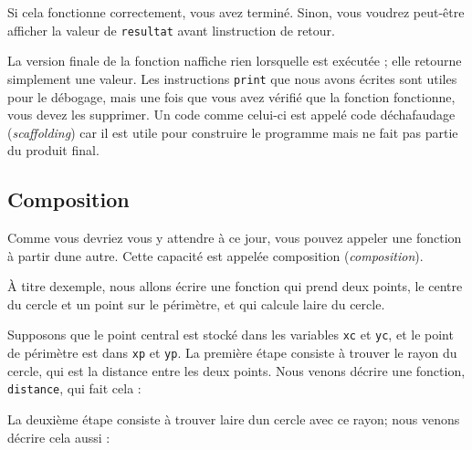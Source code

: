 Si cela fonctionne correctement, vous avez terminé. Sinon, vous voudrez
peut-être afficher la valeur de \texttt{resultat} avant
l\textquotesingle instruction de retour.

La version finale de la fonction n\textquotesingle affiche rien
lorsqu\textquotesingle elle est exécutée ; elle retourne simplement une
valeur. Les instructions \texttt{print} que nous avons écrites sont
utiles pour le débogage, mais une fois que vous avez vérifié que la
fonction fonctionne, vous devez les supprimer. Un code comme celui-ci
est appelé code d\textquotesingle échafaudage (\emph{scaffolding}) car
il est utile pour construire le programme mais ne fait pas partie du
produit final.

\hypertarget{composition}{%
\subsection{Composition}\label{composition}}

Comme vous devriez vous y attendre à ce jour, vous pouvez appeler une
fonction à partir d\textquotesingle une autre. Cette capacité est
appelée composition (\emph{composition}).

À titre d\textquotesingle exemple, nous allons écrire une fonction qui
prend deux points, le centre du cercle et un point sur le périmètre, et
qui calcule l\textquotesingle aire du cercle.

Supposons que le point central est stocké dans les variables \texttt{xc}
et \texttt{yc}, et le point de périmètre est dans \texttt{xp} et
\texttt{yp}. La première étape consiste à trouver le rayon du cercle,
qui est la distance entre les deux points. Nous venons
d\textquotesingle écrire une fonction, \texttt{distance}, qui fait cela
:

\begin{Shaded}
\begin{Highlighting}[]
\OperatorTok{=}
\end{Highlighting}
\end{Shaded}

La deuxième étape consiste à trouver l\textquotesingle aire
d\textquotesingle un cercle avec ce rayon; nous venons
d\textquotesingle écrire cela aussi :

\begin{Shaded}
\begin{Highlighting}[]
\OperatorTok{=}
\end{Highlighting}
\end{Shaded}

